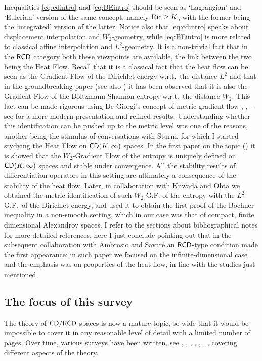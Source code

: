 \documentclass[11pt]{article}
\numberwithin{equation}{section}
\newcommand{\CD}{{\sf CD}}
\newcommand{\RCD}{{\sf RCD}}
\begin{document}
Inequalities \eqref{eq:cdintro} and \eqref{eq:BEintro} should be seen as `Lagrangian' and `Eulerian' version of the same concept, namely ${\rm Ric}\geq K$, with the former being the `integrated' version of the latter. Notice also that \eqref{eq:cdintro} speaks about displacement interpolation and $W_2$-geometry, while \eqref{eq:BEintro} is more related to classical affine interpolation and $L^2$-geometry. It is a non-trivial fact that in the $\RCD$ category both these viewpoints are available, the link between the two being the Heat Flow. Recall that it is a classical fact that the heat flow can be seen as the Gradient Flow of the Dirichlet energy w.r.t.\ the distance $L^2$ and that in the groundbreaking paper \cite{JKO98} (see also \cite{Otto01}) it has been observed that it is also the Gradient Flow of the Boltzmann-Shannon entropy w.r.t.\ the distance $W_2$. This fact  can be made rigorous using De Giorgi's concept of metric gradient flow  \cite{DeGiorgiMarinoTosques80},  \cite{DeGiorgi92}, \cite{DeGiorgi93} - see \cite{AmbrosioGigliSavare08} for a more modern presentation and refined results. Understanding whether this identification can be pushed up to the metric level was one of the reasons, another being the stimulus of conversations with Sturm, for which I started stydying the Heat Flow on $\CD(K,\infty)$ spaces. In the first paper on the topic (\cite{Gigli10}) it is showed that the $W_2$-Gradient Flow of the entropy is uniquely defined on $\CD(K,\infty)$ spaces and stable under convergence. All the stability results of differentiation operators in this setting  are ultimately a consequence of the stability of the heat flow. Later, in collaboration \cite{Gigli-Kuwada-Ohta10} with Kuwada and Ohta we obtained the  metric identification of such $W_2$-G.F. of the entropy with the $L^2$-G.F.\ of the Dirichlet energy, and used it to obtain the first proof of the Bochner inequality in a non-smooth setting, which in our case was that of compact, finite dimensional Alexandrov spaces.  I refer to the sections about bibliographical notes for more detailed references, here I just conclude pointing out that in the subsequent collaboration \cite{AmbrosioGigliSavare11-2} with Ambrosio and Savar\'e  an $\RCD$-type condition made the first appearance: in such paper we focused on the infinite-dimensional case  and the emphasis was on properties of the heat flow,  in line with the studies just mentioned.






\subsection{The focus of this survey}
The theory of $\CD/\RCD$ spaces is now a mature topic, so wide that it would be impossible to cover it in any reasonable level of detail with a limited number of pages. Over time, various surveys have been written, see \cite{AmbrosioGigliSavare-compact}, \cite{savareEMS}, \cite{AmbrosioICM}, \cite{Gigli13over}, \cite{Gigli17}, \cite{Villani2017}, \cite{Cavalletti17}, \cite{PozzettaSurvey} covering different aspects of the theory.
\end{document}
